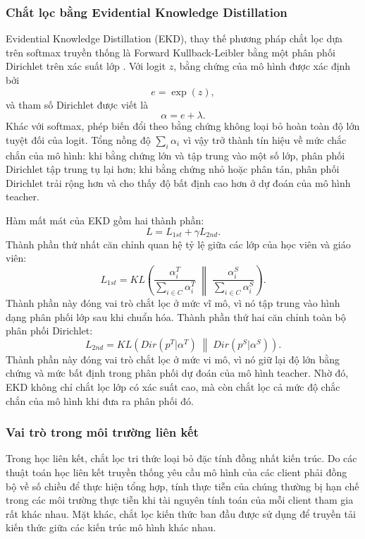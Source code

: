 \subsubsection{Chắt lọc bằng Evidential Knowledge Distillation}

Evidential Knowledge Distillation (EKD), thay thế phương pháp chắt lọc dựa trên softmax truyền thống là Forward Kullback-Leibler bằng một phân phối Dirichlet trên xác suất lớp \cite{xiang2025ekd,shen2024fdekd}. Với logit $z$, bằng chứng của mô hình được xác định bởi
$$
e=\exp(z),
$$
và tham số Dirichlet được viết là
$$
\alpha=e+\lambda.
$$
Khác với softmax, phép biến đổi theo bằng chứng không loại bỏ hoàn toàn độ lớn tuyệt đối của logit. Tổng nồng độ $\sum_i\alpha_i$ vì vậy trở thành tín hiệu về mức chắc chắn của mô hình: khi bằng chứng lớn và tập trung vào một số lớp, phân phối Dirichlet tập trung tụ lại hơn; khi bằng chứng nhỏ hoặc phân tán, phân phối Dirichlet trải rộng hơn và cho thấy độ bất định cao hơn ở dự đoán của mô hình teacher.

Hàm mất mát của EKD gồm hai thành phần:
$$
L = L_{1st} + \gamma L_{2nd}.
$$
Thành phần thứ nhất căn chỉnh quan hệ tỷ lệ giữa các lớp của học viên và giáo viên:
$$
L_{1st} = KL\!\left(\frac{\alpha_i^T}{\sum_{i \in C}\alpha_i^T} \;\middle\|\; \frac{\alpha_i^S}{\sum_{i \in C}\alpha_i^S}\right).
$$
Thành phần này đóng vai trò chắt lọc ở mức vĩ mô, vì nó tập trung vào hình dạng phân phối lớp sau khi chuẩn hóa. Thành phần thứ hai căn chỉnh toàn bộ phân phối Dirichlet:
$$
L_{2nd} = KL\!\left(Dir(p^T|\alpha^T) \;\middle\|\; Dir(p^S|\alpha^S)\right).
$$
Thành phần này đóng vai trò chắt lọc ở mức vi mô, vì nó giữ lại độ lớn bằng chứng và mức bất định trong phân phối dự đoán của mô hình teacher. Nhờ đó, EKD không chỉ chắt lọc lớp có xác suất cao, mà còn chắt lọc cả mức độ chắc chắn của mô hình khi đưa ra phân phối đó.

\subsubsection{Vai trò trong môi trường liên kết}

Trong học liên kết, chắt lọc tri thức loại bỏ đặc tính đồng nhất kiến trúc. Do các thuật toán học liên kết truyền thống yêu cầu mô hình của các client phải đồng bộ về số chiều để thực hiện tổng hợp, tính thực tiễn của chúng thường bị hạn chế trong các môi trường thực tiễn khi tài nguyên tính toán của mỗi client tham gia rất khác nhau. Mặt khác, chắt lọc kiến thức ban đầu được sử dụng để truyền tải kiến thức giữa các kiến trúc mô hình khác nhau.

